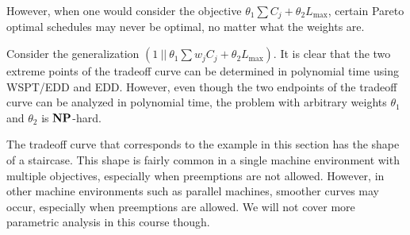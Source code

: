 However, when one would consider the objective $\theta_1 \sum C_j + \theta_2 
L_{\max}$, certain Pareto optimal schedules may never be optimal, 
no matter what the weights are. 

Consider the generalization $(1~||~\theta_1 \sum w_j C_j + \theta_2 L_{\max})$. 
It is clear that the two extreme points of the tradeoff curve can be determined 
in polynomial time using WSPT/EDD and EDD. However, even though the two 
endpoints of the tradeoff curve can be analyzed in polynomial time, the 
problem with arbitrary weights $\theta_1$ and $\theta_2$ is $\operatorname{\textbf{NP}}$-hard. 

The tradeoff curve that corresponds to the example in this section has the
shape of a staircase. This shape is fairly common in a single machine 
environment with multiple objectives, especially when preemptions are not 
allowed. However, in other machine environments such as parallel machines, 
smoother curves may occur, especially when preemptions are allowed.
We will not cover more parametric analysis in this course though. 
